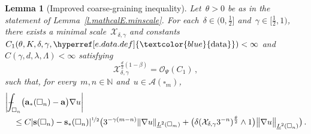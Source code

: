 \documentclass[11pt,twoside]{article} %
\let\oldsquare\square %
\renewcommand{\square}{\oldsquare}
\numberwithin{equation}{section}
\newtheorem{lemma}[theorem]{Lemma}
\theoremstyle{definition}
\newcommand{\dataref}{\hyperref[e.data.def]{\textcolor{blue}{\ensuremath{\mathrm{data}}}}}
\newcommand*{\N}{\ensuremath{\mathbb{N}}}
\newcommand{\s}{\mathbf{s}}
\renewcommand{\a}{\mathbf{a}}
\newcommand{\cu}{\square}
\newcommand{\X}{\mathcal{X}}
\renewcommand{\O}{\mathcal{O}}
\def\Xint#1{\mathchoice
{\XXint\displaystyle\textstyle{#1}}%
{\XXint\textstyle\scriptstyle{#1}}%
{\XXint\scriptstyle\scriptscriptstyle{#1}}%
{\XXint\scriptscriptstyle\scriptscriptstyle{#1}}%
\!\int}
\def\XXint#1#2#3{{\setbox0=\hbox{$#1{#2#3}{\int}$}
\vcenter{\hbox{$#2#3$}}\kern-.5\wd0}}
\def\fint{\Xint-}
\newcommand{\A}{\mathcal{A}}
\begin{document}
\begin{lemma}[Improved coarse-graining inequality]
\label{l.fluxmaps.now.better}
Let~$\theta >0$ be as in the statement of Lemma~\ref{l.mathcalE.minscale}.
For each~$\delta \in (0,\tfrac12]$ and~$\gamma\in [\tfrac12,1)$, there exists a minimal scale~$\X_{\delta,\gamma}$ and constants~$C_1(\theta,K,\delta,\gamma,\dataref)<\infty$ and~$C(\gamma,d,\lambda,\Lambda)<\infty$
satisfying   
\begin{equation} 
\label{e.X.integrability.delta.gamma}
\X_{\delta,\gamma}^{\frac d2(1-\beta)} = \O_\Psi(C_1)\,,
\end{equation}
such that, for every~$m,n\in\N$ and~$u\in \A(\cu_m)$, 
\begin{align}
\label{e.fluxmaps.now.better}
\lefteqn{
\biggl| \fint_{\cu_n} \bigl( \a_*(\cu_n) - \a \bigr) \nabla u \biggr| 
} \quad & 
\notag \\ &
\leq
C | \s(\cu_n) - \s_*(\cu_n) |^{\nicefrac12}  \bigl( 3^{-\gamma (m-n)}
\| \nabla u \|_{\underline{L}^2(\cu_m)}
+ \bigl(  \delta( \X_{\delta,\gamma} 3^{-n})^{{\frac\theta 2}}\wedge 1\bigr) \bigl\| \nabla u \bigr\|_{\underline{L}^2(\cu_n)} \bigr) 
\,.
\end{align}
\end{lemma}
\end{document}
